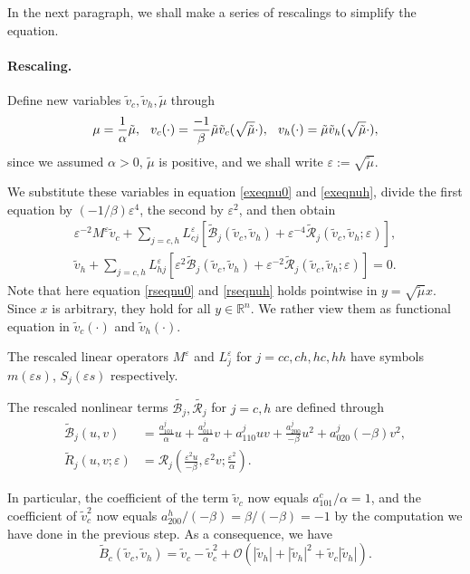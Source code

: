 \documentclass[letterpaper,11pt]{article}
\newcommand{\R}{\mathbb{R}}
\newcommand{\rmO}{\mathcal{O}}
\newcommand{\eps}{\varepsilon}
\newcommand{\B}{\mathcal{B}}
\newcommand{\Rm}{\mathcal{R}}
\numberwithin{equation}{section}
\theoremstyle{plain}
\theoremstyle{remark}
\begin{document}
In the next paragraph, we shall make a series of rescalings to simplify the equation.

\paragraph{Rescaling.} Define new variables $\tilde{v}_c,\tilde{v}_h, \tilde{\mu}$ through 
\[
\mu=\frac{1}{\alpha}\tilde{\mu}, \hspace{0.1in} v_c(\cdot)=\frac{-1}{\beta}\tilde{\mu}\tilde{v}_c(\sqrt{\tilde{\mu}} \cdot), \hspace{0.1in} v_h(\cdot)=\tilde{\mu} \tilde{v}_h(\sqrt{\tilde{\mu}} \cdot),
\]
since we assumed $\alpha >0$, $\tilde{\mu}$ is positive, and we shall write $\eps := \sqrt{\tilde{\mu}}$.

We substitute these variables in equation \eqref{exeqnu0} and \eqref{exeqnuh}, divide the first equation by $(-1/\beta)\eps^4$, the second by $\eps^2$, and then obtain
\begin{align}
\eps^{-2}M^\eps \tilde{v}_c + \sum_{j=c,h} L_{cj}^{\eps}[\tilde{\B}_j(\tilde{v}_c,\tilde{v}_h)+\eps^{-4}\tilde{\Rm}_j(\tilde{v}_c,\tilde{v}_h;\eps)],\label{rseqnu0}\\
\tilde{v}_h +\sum_{j=c,h} L_{hj}^{\eps}[\eps^2\tilde{\B}_j(\tilde{v}_c,\tilde{v}_h)+\eps^{-2}\tilde{\Rm}_j(\tilde{v}_c,\tilde{v}_h;\eps)] = 0. \label{rseqnuh}
\end{align}
Note that here equation \eqref{rseqnu0} and \eqref{rseqnuh} holds pointwise in $y = \sqrt{\tilde{\mu}} x$. Since $x$ is arbitrary, they hold for all $y \in \R^n$. We rather view them as functional equation in $\tilde{v}_c(\cdot)$ and $\tilde{v}_h(\cdot)$.

The rescaled linear operators $M^\eps $ and $L^\eps_j$ for $j = cc,ch,hc,hh$ have symbols $m(\eps s)$, $S_j(\eps s)$ respectively. 

The rescaled nonlinear terms $\tilde{\B_j}, \tilde{\Rm_j}$ for $j=c,h$ are defined through 
\begin{align*}
\tilde{\B}_j(u,v)&=\frac{a^j_{101}}{\alpha}  u+\frac{a^j_{011}}{\alpha} v+a^j_{110}uv + \frac{a^j_{200}}{-\beta}u^2+a^j_{020}(-\beta)v^2 ,\\
\tilde{R}_j ( u,v;\eps)&=\Rm_j \left(\frac{\eps^2u}{-\beta},\eps^2v;\frac{\eps^2}{\alpha}\right).
\end{align*}

In particular, the coefficient of the term $\tilde{v}_c$ now equals $ a_{101}^c/\alpha=1$, and the coefficient of $\tilde{v}_c^2$ now equals $a_{200}^h/(-\beta)=\beta/(-\beta)=-1$ by the computation we have done in the previous step. As a consequence, we have 
\[
\tilde{B}_c(\tilde{v}_c,\tilde{v}_h) = \tilde{v}_c-\tilde{v}_c^2 + \rmO(|\tilde{v}_h|+|\tilde{v} _h|^2+\tilde{v}_c|\tilde{v} _h|).
\] 
\end{document}
